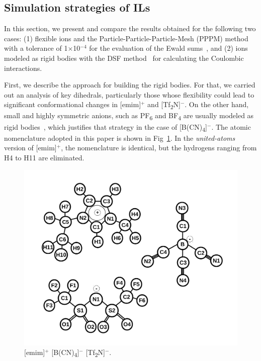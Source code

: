 \documentclass[3p,twocolumn]{elsarticle}
\begin{document}
\subsection{Simulation strategies of ILs}
\label{sec:prel_results}

In this section, we present and compare the results obtained for the following two cases: (1) flexible ions and the Particle-Particle-Particle-Mesh (PPPM) method~\cite{Hockney_1988} with a tolerance of 1$\times$10$^{-4}$ for the evaluation of the Ewald sums~\cite{Ewald_1921}, and (2) ions modeled as rigid bodies with the DSF method~\cite{Fennell2006} for calculating the Coulombic interactions.

First, we describe the approach for building the rigid bodies. For that, we carried out an analysis of key dihedrals, particularly those whose flexibility could lead to significant conformational changes in [emim]$^{+}$ and [Tf\textsubscript{2}N]$^{-}$. On the other hand, small and highly symmetric anions, such as PF\textsubscript{6} and BF\textsubscript{4} are usually modeled as rigid bodies~\cite{HANKE_2001,Hanke_2003,Lynden_Bell_2006}, which justifies that strategy in the case of [B(CN)\textsubscript{4}]$^{-}$. The atomic nomenclature adopted in this paper is shown in Fig~\ref{fig:atoms_id}. In the \textit{united-atoms} version of [emim]$^{+}$, the nomenclature is identical, but the hydrogens ranging from H4 to H11 are eliminated.

\begin{figure}[H]
\centering
\includegraphics[width=\linewidth]{ions_paper.pdf}
\caption{[emim]$^{+}$ [B(CN)\textsubscript{4}]$^{-}$ [Tf\textsubscript{2}N]$^{-}$.}
\label{fig:atoms_id}
\end{figure}
\end{document}
